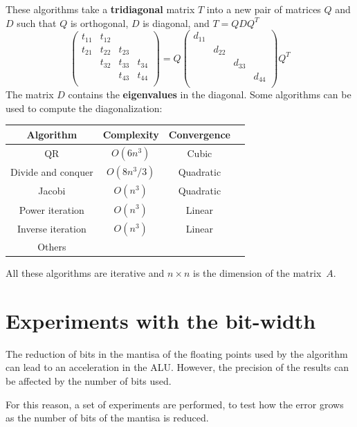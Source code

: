 \documentclass[11pt,a4paper]{article}
\newcommand*\mat[1]{ \begin{pmatrix} #1 \end{pmatrix}}
\begin{document}
These algorithms take a \textbf{tridiagonal} matrix $T$ into a new pair of 
matrices $Q$ and $D$ such that $Q$ is orthogonal, $D$ is diagonal, and $T = Q 
D Q^T$
%
$$
	\mat{
		t_{11} & t_{12} &        &        \\
		t_{21} & t_{22} & t_{23} &        \\
		       & t_{32} & t_{33} & t_{34} \\
		       &        & t_{43} & t_{44} \\
	}=
	Q
	\mat{
		d_{11} &        &        &        \\
		       & d_{22} &        &        \\
		       &        & d_{33} &        \\
		       &        &        & d_{44} \\
	}
	Q^T
$$
%
The matrix $D$ contains the \textbf{eigenvalues} in the diagonal. Some 
algorithms can be used to compute the diagonalization:
%
\begin{center}
\begin{tabular}{c c c c}
	\toprule
	Algorithm							& Complexity  & Convergence	\\
	\midrule
	QR                  & $O(6n^3)$ 	& Cubic 			\\
	Divide and conquer  & $O(8n^3/3)$ & Quadratic 	\\
	Jacobi              & $O(n^3)$    & Quadratic 	\\
	Power iteration			& $O(n^3)$    & Linear 			\\
	Inverse iteration	  & $O(n^3)$    & Linear 			\\
	Others							&             &          		\\
	\bottomrule
\end{tabular}
\end{center}
%
%
All these algorithms are iterative and $n \times n$ is the dimension of the 
matrix~$A$.

\section{Experiments with the bit-width}

The reduction of bits in the mantisa of the floating points used by the 
algorithm can lead to an acceleration in the ALU. However, the precision of the 
results can be affected by the number of bits used.

For this reason, a set of experiments are performed, to test how the error grows 
as the number of bits of the mantisa is reduced.
\end{document}
